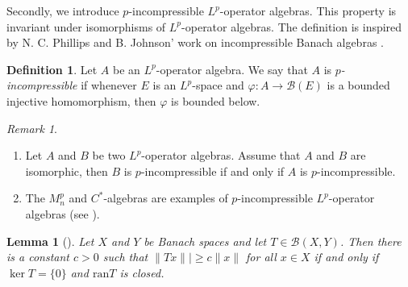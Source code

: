 \documentclass[reqno,11pt]{amsart}
\theoremstyle{plain}
\newtheorem{lem}[thm]{Lemma}
\theoremstyle{definition}
\newtheorem{defn}[thm]{Definition}
\theoremstyle{remark}
\newtheorem{rmk}[thm]{Remark}
\begin{document}
Secondly,
we introduce $p$-incompressible $L^p$-operator algebras. This property is invariant under isomorphisms of $L^p$-operator algebras. The definition is inspired by N. C. Phillips and B. Johnson' work on incompressible Banach algebras \cite{incompressible}.





\begin{defn}
Let $A$ be an $L^p$-operator algebra.
We say that $A$ is {\it $p$-incompressible} if whenever  $E$ is an $L^p$-space and $\varphi:A\rightarrow \mathcal{B}(E)$ is a bounded injective homomorphism, then $\varphi$ is bounded below.
\end{defn}

\begin{rmk}\label{c}
\begin{enumerate}
\item[(i)] Let $A$ and $B$ be two $L^p$-operator algebras. Assume that $A$ and $B$ are isomorphic, then $B$ is $p$-incompressible if and only if $A$ is $p$-incompressible.
\item[(ii)] The $M_n^p$ and $C^*$-algebras are examples of $p$-incompressible $L^p$-operator algebras (see \cite{incompressible}).
\end{enumerate}
\end{rmk}

\begin{lem}[{\cite[Exercise 5 on page 93]{Conway}}]\label{below}
Let $X$ and $Y$ be Banach spaces and let $T\in \mathcal{B}(X,Y)$. Then there is a constant $c>0$ such that $\|Tx\||\geq c\|x\|$ for all $x\in X$ if and only if $\ker T=\{0\}$ and $\mathrm{ran} T$ is closed.
\end{lem}
\end{document}
